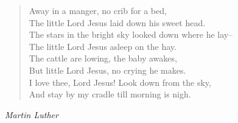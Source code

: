 
\begin{verse}
Away in a manger, no crib for a bed,\\
The little Lord Jesus laid down his sweet head.\\
The stars in the bright sky looked down where he lay--\\
The little Lord Jesus asleep on the hay.\\[0.7em]

The cattle are lowing, the baby awakes,\\
But little Lord Jesus, no crying he makes.\\
I love thee, Lord Jesus! Look down from the sky,\\
And stay by my cradle till morning is nigh.%
\end{verse}

\vspace{0.5\baselineskip}
\noindent\textit{Martin Luther}

\newpage
